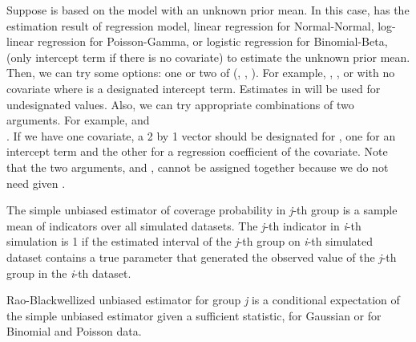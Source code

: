 \documentclass[a4paper]{book}
\begin{document}
\begin{Details}
Suppose  is based on the model with an unknown prior mean. In this case,  has the estimation result of regression model, linear regression for Normal-Normal, log-linear regression for Poisson-Gamma, or logistic regression for Binomial-Beta, (only intercept term if there is no covariate) to estimate the unknown prior mean. Then, we can try some options: one or two of (, , ). For example, , , or  with no covariate where  is a designated intercept term. Estimates in  will be used for undesignated values. Also, we can try appropriate combinations of two arguments. For example,  and \\{}
. If we have one covariate, a 2 by 1 vector should be designated for , one for an intercept term and the other for a regression coefficient of the covariate. Note that the two arguments,  and , cannot be assigned together because we do not need  given . 

The simple unbiased estimator of coverage probability in \emph{j}-th group is a sample mean of indicators over all simulated datasets. The \emph{j}-th indicator in \emph{i}-th simulation is 1 if the estimated interval of the \emph{j}-th group on \emph{i}-th simulated dataset contains a true parameter 
 that generated the observed value of the \emph{j}-th group in the 
\emph{i}-th dataset.

Rao-Blackwellized unbiased estimator for group \emph{j} is a conditional expectation of the simple unbiased estimator given a sufficient statistic,  for Gaussian or  for Binomial and Poisson data.
\end{Details}
%
\end{document}
